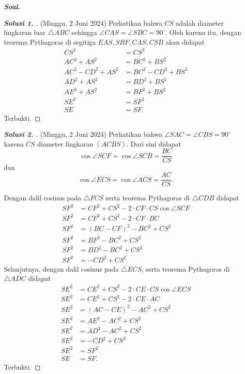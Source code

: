 \textbf{\textit{Soal. }} 

\begin{proof}[\textbf{Solusi 1. }] (Minggu, 2 Juni 2024) 
Perhatikan bahwa $CS$ adalah diameter lingkaran luar $\triangle ABC$ sehingga $\angle CAS = \angle SBC = 90^\circ$. Oleh karena itu, dengan teorema Pythagoras di segitiga $EAS, SBF, CAS, CSB$ akan didapat
\begin{align*}
    CS^2 &= CS^2\\
    AC^2 + AS^2 &= BC^2+BS^2\\
    AC^2 - CD^2 + AS^2 &= BC^2 - CD^2 + BS^2\\
    AD^2 + AS^2 &= BD^2 + BS^2\\
    AE^2 + AS^2 &= BF^2 + BS^2\\
    SE^2 &= SF^2\\
    SE &= SF.
\end{align*}
Terbukti.
\end{proof}

\begin{proof}[\textbf{Solusi 2. }] (Minggu, 2 Juni 2024) 
Perhatikan bahwa $\angle SAC = \angle CBS = 90^\circ$ karena $CS$ diameter lingkaran $(ACBS)$. Dari sini didapat 
$$\cos \angle SCF = \cos \angle SCB = \frac{BC}{CS}$$ 
dan 
$$\cos \angle ECS = \cos \angle ACS = \frac{AC}{CS}.$$

Dengan dalil cosinus pada $\triangle FCS$ serta teorema Pythagoras di $\triangle CDB$ didapat
\begin{align*}
    SF^2 &= CF^2 + CS^2 - 2\cdot CF \cdot CS \cos \angle SCF\\
    SF^2 &= CF^2 + CS^2 - 2\cdot CF \cdot BC\\
    SF^2 &= (BC-CF)^2 - BC^2 + CS^2\\
    SF^2 &= BF^2 - BC^2 + CS^2\\
    SF^2 &= BD^2 - BC^2 + CS^2\\
    SF^2 &= -CD^2 + CS^2
\end{align*}
Selanjutnya, dengan dalil cosinus pada $\triangle ECS$, serta teorema Pythagoras di $\triangle ADC$ didapat
\begin{align*}
    SE^2 &= CE^2 + CS^2 - 2\cdot CE \cdot CS \cos \angle ECS \\
    SE^2 &= CE^2 + CS^2 - 2\cdot CE \cdot AC\\
    SE^2 &= (AC-CE)^2 - AC^2 + CS^2\\
    SE^2 &= AE^2 - AC^2 + CS^2\\
    SE^2 &= AD^2 - AC^2 + CS^2\\
    SE^2 &= -CD^2 + CS^2\\
    SE^2 &= SF^2\\
    SE &= SF.
\end{align*}
Terbukti.
\end{proof}

